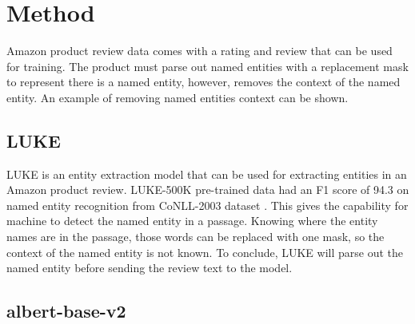 \documentclass[11pt,a4paper]{article}
\begin{document}
\section{Method}

Amazon product review data comes with a rating and review that can be used for training. The product must parse out named entities with a replacement mask to represent there is a named entity, however, removes the context of the named entity. An example of removing named entities context can be shown.



\subsection{LUKE}

LUKE is an entity extraction model that can be used for extracting entities in an Amazon product review. LUKE-500K pre-trained data had an F1 score of 94.3 on named entity recognition from CoNLL-2003 dataset \cite{yamada-etal-2020-luke}. This gives the capability for machine to detect the named entity in a passage. Knowing where the entity names are in the passage, those words can be replaced with one mask, so the context of the named entity is not known. To conclude, LUKE will parse out the named entity before sending the review text to the model.

\subsection{albert-base-v2}
\end{document}
